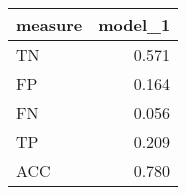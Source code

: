 \begin{tabular}{lr}
\toprule
measure &  model\_1 \\
\midrule
     TN &    0.571 \\
     FP &    0.164 \\
     FN &    0.056 \\
     TP &    0.209 \\
    ACC &    0.780 \\
\bottomrule
\end{tabular}

